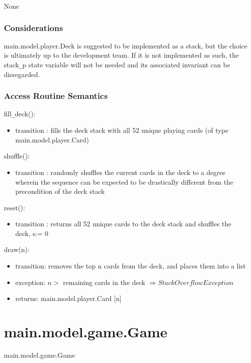 \documentclass[12pt, titlepage]{article}
\begin{document}
None

\subsubsection* {Considerations}

main.model.player.Deck is suggested to be implemented as a stack, but the choice is ultimately up to the development team. If it is not implemented as such, the stack\verb|_|p state variable will not be needed and its associated invariant can be disregarded.

\subsubsection* {Access Routine Semantics}

\noindent fill\verb|_|deck():
\begin{itemize}
\item transition : fills the deck stack with all 52 unique playing cards (of type main.model.player.Card)
\end{itemize}

\noindent shuffle():
\begin{itemize}
\item transition : randomly shuffles the current cards in the deck to a degree wherein the sequence can be expected to be drastically different from the precondition of the deck stack 
\end{itemize}

\noindent reset():
\begin{itemize}
\item transition : returns all 52 unique cards to the deck stack and shuffles the deck, s:= 0
\end{itemize}

\noindent draw(n):
\begin{itemize}
\item transition: removes the top n cards from the deck, and places them into a list 
\item exception: $n >$ remaining cards in the deck $\Longrightarrow StackOverflowException$
\item returns: main.model.player.Card [n]
\end{itemize}

\section*{main.model.game.Game}

main.model.game.Game
\end{document}
